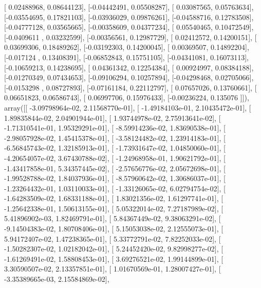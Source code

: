 \documentclass{article}
\begin{document}
       [ 0.02488968,  0.08644123],
       [-0.04442491,  0.05508287],
       [ 0.03087565,  0.05763634],
       [-0.03554695,  0.17821103],
       [-0.03936029,  0.09876261],
       [-0.04588716,  0.12783508],
       [-0.04777128,  0.03565665],
       [-0.00358609,  0.04377234],
       [ 0.05540465,  0.10472549],
       [-0.0409611 ,  0.03232599],
       [-0.00356561,  0.12987729],
       [ 0.02412572,  0.14200151],
       [ 0.03699306,  0.18489262],
       [-0.03192303,  0.14200045],
       [ 0.00369507,  0.14892204],
       [-0.017124  ,  0.13408391],
       [-0.06852843,  0.15751105],
       [-0.04341081,  0.16073113],
       [-0.10659213,  0.14238695],
       [ 0.04361342,  0.12254384],
       [ 0.00924997,  0.08384188],
       [-0.01270349,  0.07434653],
       [-0.09106294,  0.10257894],
       [-0.04298468,  0.02705066],
       [-0.0153298 ,  0.08727893],
       [-0.07161184,  0.22112797],
       [ 0.07657026,  0.13760661],
       [ 0.06651823,  0.06586743],
       [ 0.06997706,  0.15976433],
       [-0.00236224,  0.135076  ]]), array([[ -3.09798964e-02,   2.11568770e-01],
       [ -1.49184103e-01,   2.10435472e-01],
       [  1.89835844e-02,   2.04901944e-01],
       [  1.93744978e-02,   2.75913641e-02],
       [ -1.71310541e-01,   1.95329291e-01],
       [ -8.59914236e-02,   1.83690538e-01],
       [ -2.98057928e-02,   1.45415378e-01],
       [ -3.58124482e-02,   1.23914183e-01],
       [ -6.56845743e-02,   1.32185913e-01],
       [ -1.73931647e-02,   1.04850060e-01],
       [ -4.20654057e-02,   3.67430788e-02],
       [ -1.24968958e-01,   1.90621792e-01],
       [ -1.43417858e-01,   5.34357445e-02],
       [ -2.57656776e-02,   2.05672698e-01],
       [ -1.99528788e-02,   1.84037936e-01],
       [ -8.57960642e-02,   1.30686037e-01],
       [ -1.23264432e-01,   1.03110033e-01],
       [ -1.33126065e-02,   6.02794754e-02],
       [ -1.64283509e-02,   1.68331188e-01],
       [  1.83021356e-02,   1.61297741e-01],
       [ -1.25642338e-01,   1.50613155e-01],
       [  5.05322014e-02,   7.27187989e-02],
       [  5.41896902e-03,   1.82469791e-01],
       [  5.84367449e-02,   9.38063291e-02],
       [ -9.14504383e-02,   1.80708406e-01],
       [  5.15053038e-02,   2.12555073e-01],
       [  5.94172407e-02,   1.47238365e-01],
       [  5.33772791e-02,   7.82252033e-02],
       [ -1.50282307e-02,   1.02182042e-01],
       [  5.24452420e-02,   9.82998277e-02],
       [ -1.61269491e-02,   1.58808453e-01],
       [  3.69276521e-02,   1.99144899e-01],
       [  3.30590507e-02,   2.13357851e-01],
       [  1.01670569e-01,   1.28007427e-01],
       [ -3.35389665e-03,   2.15584869e-02],
\end{document}
